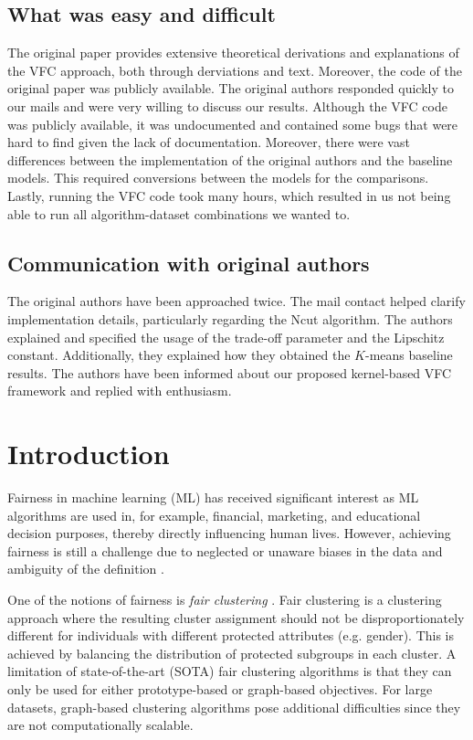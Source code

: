 \subsection*{What was easy and difficult}

The original paper provides extensive theoretical derivations and explanations of the VFC approach, both through derviations and text. Moreover, the code of the original paper was publicly available. The original authors responded quickly to our mails and were very willing to discuss our results.
Although the VFC code was publicly available, it was undocumented and contained some bugs that were hard to find given the lack of documentation. Moreover, there were vast differences between the implementation of the original authors and the baseline models. This required conversions between the models for the comparisons. Lastly, running the VFC code took many hours, which resulted in us not being able to run all algorithm-dataset combinations we wanted to.

\subsection*{Communication with original authors}
The original authors have been approached twice. The mail contact helped clarify implementation details, particularly regarding the Ncut algorithm. The authors explained and specified the usage of the trade-off parameter and the Lipschitz constant. Additionally, they explained how they obtained the $K$-means baseline results. The authors have been informed about our proposed kernel-based VFC framework and replied with enthusiasm.

\newpage

\section{Introduction}
Fairness in machine learning (ML) has received significant interest as ML algorithms are used in, for example, financial, marketing, and educational decision purposes, thereby directly influencing human lives. However, achieving fairness is still a challenge due to neglected or unaware biases in the data and ambiguity of the definition \citep{mehrabi2021survey}.

One of the notions of fairness is \textit{fair clustering} \citep{chierichetti2018fair, bera2019fair,backurs2019scalable, huang2019coresets, rosner2018privacy, schmidt2018fair, kleindessner2019guarantees}. Fair clustering is a clustering approach where the resulting cluster assignment should not be disproportionately different for individuals with different protected attributes (e.g. gender). This is achieved by balancing the distribution of protected subgroups in each cluster. A limitation of state-of-the-art (SOTA) fair clustering algorithms is that they can only be used for either prototype-based or graph-based objectives. For large datasets, graph-based clustering algorithms pose additional difficulties since they are not computationally scalable.

